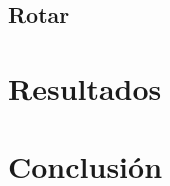 \documentclass[a4paper,10pt,twoside]{article}
\begin{document}
\subsection{Rotar}



\section{Resultados}

\blindtext




\section{Conclusión}

\blindtext
\end{document}
